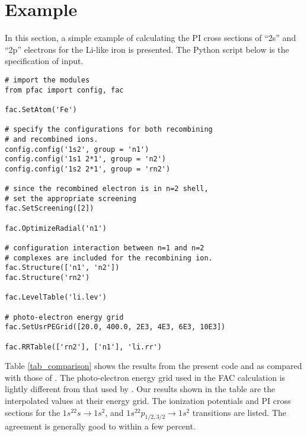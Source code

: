 \documentclass{elsart}
\begin{document}
\section{Example}
\label{sec_example}
In this section, a simple example of calculating the PI cross sections of
``2s'' and ``2p'' electrons for the Li-like iron is presented. The Python
script below is the specification of input.
\begin{verbatim}
# import the modules
from pfac import config, fac

fac.SetAtom('Fe')

# specify the configurations for both recombining 
# and recombined ions.
config.config('1s2', group = 'n1')
config.config('1s1 2*1', group = 'n2')
config.config('1s2 2*1', group = 'rn2')

# since the recombined electron is in n=2 shell, 
# set the appropriate screening
fac.SetScreening([2])

fac.OptimizeRadial('n1')

# configuration interaction between n=1 and n=2 
# complexes are included for the recombining ion.
fac.Structure(['n1', 'n2'])
fac.Structure('rn2')

fac.LevelTable('li.lev')

# photo-electron energy grid
fac.SetUsrPEGrid([20.0, 400.0, 2E3, 4E3, 6E3, 10E3])

fac.RRTable(['rn2'], ['n1'], 'li.rr')
\end{verbatim}

Table \ref{tab_comparison} shows the results from the present code and
as compared with those of
\citet{zhang98}. The photo-electron energy grid used in the FAC calculation
is lightly different from that used by \citet{zhang98}. Our results shown in
the table are the 
interpolated values at their energy grid. The ionization potentials and PI
cross sections for the $1s^22s$$\rightarrow$$1s^2$, and
$1s^22p_{1/2,3/2}$$\rightarrow$$1s^2$ transitions are listed. The agreement is
generally good to within a few percent.
\end{document}
